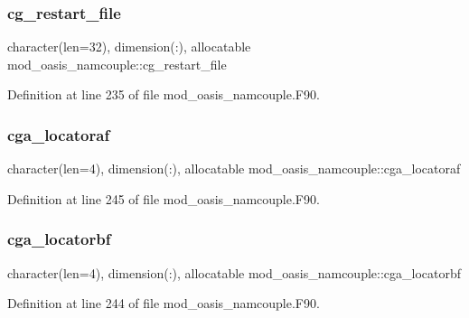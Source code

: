 \subsubsection{\texorpdfstring{cg\+\_\+restart\+\_\+file}{cg\_restart\_file}}
{\footnotesize\ttfamily character(len=32), dimension(\+:), allocatable mod\+\_\+oasis\+\_\+namcouple\+::cg\+\_\+restart\+\_\+file\hspace{0.3cm}{\ttfamily [private]}}



Definition at line 235 of file mod\+\_\+oasis\+\_\+namcouple.\+F90.

\mbox{\label{namespacemod__oasis__namcouple_a6f4080d45f0b9be5a0466967f535b83b}} 
\subsubsection{\texorpdfstring{cga\+\_\+locatoraf}{cga\_locatoraf}}
{\footnotesize\ttfamily character(len=4), dimension(\+:), allocatable mod\+\_\+oasis\+\_\+namcouple\+::cga\+\_\+locatoraf\hspace{0.3cm}{\ttfamily [private]}}



Definition at line 245 of file mod\+\_\+oasis\+\_\+namcouple.\+F90.

\mbox{\label{namespacemod__oasis__namcouple_ac22155599e9b49d57514dd1f7dc9928a}} 
\subsubsection{\texorpdfstring{cga\+\_\+locatorbf}{cga\_locatorbf}}
{\footnotesize\ttfamily character(len=4), dimension(\+:), allocatable mod\+\_\+oasis\+\_\+namcouple\+::cga\+\_\+locatorbf\hspace{0.3cm}{\ttfamily [private]}}



Definition at line 244 of file mod\+\_\+oasis\+\_\+namcouple.\+F90.

